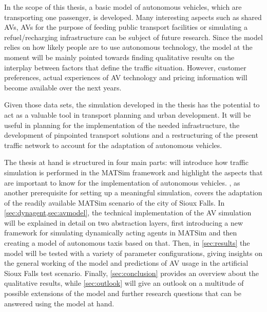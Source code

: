 In the scope of this thesis, a basic model of autonomous vehicles, which are transporting one passenger, is developed. Many
interesting aspects such as shared AVs, AVs for the purpose of feeding
public transport facilities or simulating a refuel/recharging infrastructure can
be subject of future research. Since the model relies on how likely
people are to use autonomous technology, the model at the moment will be mainly
pointed towards finding qualitative results on the interplay between factors that
define the traffic situation. However, customer preferences, actual experiences of AV technology and pricing information will
become available over the next years.

Given those data sets, the simulation developed in the thesis has the potential
to act as a valuable tool in transport planning and urban development. It will be useful
in planning for the implementation of the needed infrastructure, the development of
pinpointed transport solutions and a restructuring of the present traffic network
to account for the adaptation of autonomous vehicles.

The thesis at hand is structured in four main parts:  will introduce how
traffic simulation is performed in the MATSim framework and highlight the aspects
that are important to know for the implementation of autonomous vehicles. ,
as another prerequisite for setting up a meaningful simulation, covers the adaptation
of the readily available MATSim scenario of the city of Sioux Falls. In \cref{sec:dynagent,sec:avmodel}, the technical implementation
of the AV simulation will be explained in detail on two abstraction layers, first
introducing a new framework for simulating dynamically acting agents in MATSim
and then creating a model of autonomous taxis based on that. Then, in \cref{sec:results}
the model will be tested with a variety of parameter configurations, giving
insights on the general working of the model and predictions of AV usage in the
artificial Sioux Falls test scenario. Finally,
\cref{sec:conclusion} provides an overview about the qualitative results, while
\cref{sec:outlook} will give an outlook on
a multitude of possible extensions of the model and further research questions that
can be answered using the model at hand.
